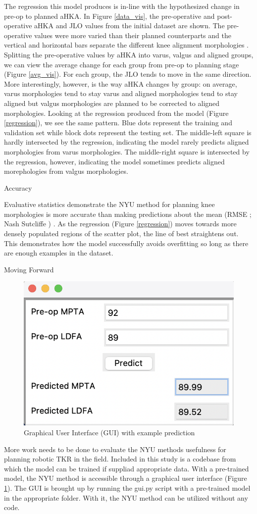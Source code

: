 \documentclass{article}
\begin{document}
	The regression this model produces is in-line with the hypothesized change in pre-op to planned aHKA.
In Figure \ref{data_vis}, the pre-operative and post-operative aHKA and JLO values from the initial dataset are shown.
The pre-operative values were more varied than their planned counterparts and the vertical and horizontal bars separate the different knee alignment morphologies \cite{cpak-paper}.
Splitting the pre-operative values by aHKA into varus, valgus and aligned groups, we can view the average change for each group from pre-op to planning stage (Figure \ref{avg_vis}).
For each group, the JLO tends to move in the same direction. More interestingly, however, is the way aHKA changes by group: 
on average, varus morphologies tend to stay varus and aligned morphologies tend to stay aligned but valgus morphologies are planned to be corrected to aligned morphologies.
Looking at the regression produced from the model (Figure \ref{regression}), we see the same pattern.
Blue dots represent the training and validation set while block dots represent the testing set.
The middle-left square is hardly intersected by the regression, indicating the model rarely predicts aligned morphologies from varus morphologies.
The middle-right square is intersected by the regression, however, indicating the model sometimes predicts aligned morephologies from valgus morphologies.

Accuracy

	Evaluative statistics demonstrate the NYU method for planning knee morphologies is more accurate than making predictions about the mean
(RMSE \mse; Nash Sutcliffe \ns) \cite{goodness-of-fit}. 
As the regression (Figure \ref{regression}) moves towards more densely populated regions of the scatter plot, the line of best straightens out.
This demonstrates how the model successfully avoids overfitting so long as there are enough examples in the dataset.

Moving Forward

\begin{figure}[h]
	\centering
	\includegraphics[width=.5\linewidth]{gui.png}
	\caption{Graphical User Interface (GUI) with example prediction}
	\label{gui}
\end{figure}

	More work needs to be done to evaluate the NYU methods usefulness for planning robotic TKR in the field.
Included in this study is a codebase from which the model can be trained if suppliad appropriate data. With a pre-trained model,
the NYU method is accessible through a graphical user interface (Figure \ref{gui}).
The GUI is brought up by running the gui.py script with a pre-trained model in the appropriate folder.
With it, the NYU method can be utilized without any code.

\medskip

\printbibliography
\end{document}
